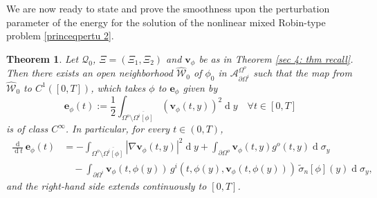 \documentclass[11pt,reqno,a4paper]{amsart}
\theoremstyle{plain}
\newtheorem{theorem}{Theorem}[section]
\theoremstyle{definition}
\renewcommand{\d}[1]{\ensuremath{\operatorname{d}\!{#1}}}
\begin{document}
We are now ready to state and prove the smoothness upon the perturbation parameter of the energy for the solution of the nonlinear mixed Robin-type problem \eqref{princeqpertu 2}.

\begin{theorem}\label{thm smooth energy robin}
    Let $\mathcal{Q}_0$, $\Xi=(\Xi_1,\Xi_2)$ and $\mathbf{v}_\phi$ be as in Theorem \ref{sec 4: thm recall}. Then there exists an open neighborhood $\widehat{\mathcal W}_0$ of $\phi_0$ in $\mathcal A_{\partial\Omega^i}^{\Omega^o}$ such that the map from $\widehat{\mathcal{W}}_0$ to $C^1([0,T])$, which takes $\phi$ to $\mathbf{e}_\phi$ given by
    \begin{equation*}
    \mathbf{e}_\phi(t) := \frac{1}{2} \int_{\Omega^o \setminus \overline{\Omega^i[\phi]}} (\mathbf{v}_\phi(t,y))^2 \d y \quad \forall t \in [0,T]
    \end{equation*}
    is of class $C^\infty$. In particular, for every $t\in(0,T)$,
    \begin{equation}\label{eq: derivative of e 2}
    \begin{aligned}
        \frac{\d{}}{\d t}\mathbf{e}_\phi(t)
        &=-\int_{\Omega^o\setminus\overline{\Omega^i[\phi]}}|\nabla \mathbf{v}_\phi(t,y)|^2 \d y
        +\int_{\partial\Omega^o} \mathbf{v}_\phi(t,y)g^o(t,y) \d\sigma_y
        \\
        &\quad -\int_{\partial\Omega^i} \mathbf{v}_\phi(t,\phi(y)) \, g^i(t,\phi(y),\mathbf{v}_\phi(t,\phi(y))) \, \tilde\sigma_n[\phi](y) \d\sigma_y,
    \end{aligned}
    \end{equation}
    and the right-hand side extends continuously to $[0,T]$.
\end{theorem}
\end{document}
